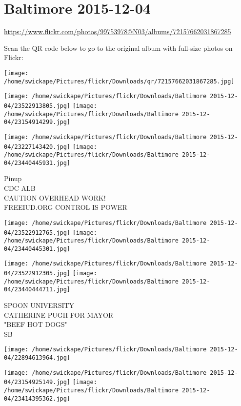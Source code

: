 \documentclass[10pt,letterpaper]{article}
\title{}
\author{}
\date{}
\begin{document}
\section*{Baltimore 2015-12-04}

\url{https://www.flickr.com/photos/99753978@N03/albums/72157662031867285}

Scan the QR code below to go to the original album with full-size photos on Flickr:

\texttt{[image: /home/swickape/Pictures/flickr/Downloads/qr/72157662031867285.jpg]}
\pagebreak

\texttt{[image: /home/swickape/Pictures/flickr/Downloads/Baltimore 2015-12-04/23522913805.jpg]}
\texttt{[image: /home/swickape/Pictures/flickr/Downloads/Baltimore 2015-12-04/23154914299.jpg]}

\texttt{[image: /home/swickape/Pictures/flickr/Downloads/Baltimore 2015-12-04/23227143420.jpg]}
\texttt{[image: /home/swickape/Pictures/flickr/Downloads/Baltimore 2015-12-04/23440445931.jpg]}

Pinup\\
CDC ALB\\
CAUTION OVERHEAD WORK!\\
FREEIUD.ORG CONTROL IS POWER
\pagebreak

\texttt{[image: /home/swickape/Pictures/flickr/Downloads/Baltimore 2015-12-04/23522912765.jpg]}
\texttt{[image: /home/swickape/Pictures/flickr/Downloads/Baltimore 2015-12-04/23440445301.jpg]}

\texttt{[image: /home/swickape/Pictures/flickr/Downloads/Baltimore 2015-12-04/23522912305.jpg]}
\texttt{[image: /home/swickape/Pictures/flickr/Downloads/Baltimore 2015-12-04/23440444711.jpg]}

SPOON UNIVERSITY\\
CATHERINE PUGH FOR MAYOR\\
"BEEF HOT DOGS"\\
SB
\pagebreak

\texttt{[image: /home/swickape/Pictures/flickr/Downloads/Baltimore 2015-12-04/22894613964.jpg]}

\vspace{0.25in}
\texttt{[image: /home/swickape/Pictures/flickr/Downloads/Baltimore 2015-12-04/23154925149.jpg]}
\texttt{[image: /home/swickape/Pictures/flickr/Downloads/Baltimore 2015-12-04/23414395362.jpg]}
\end{document}
